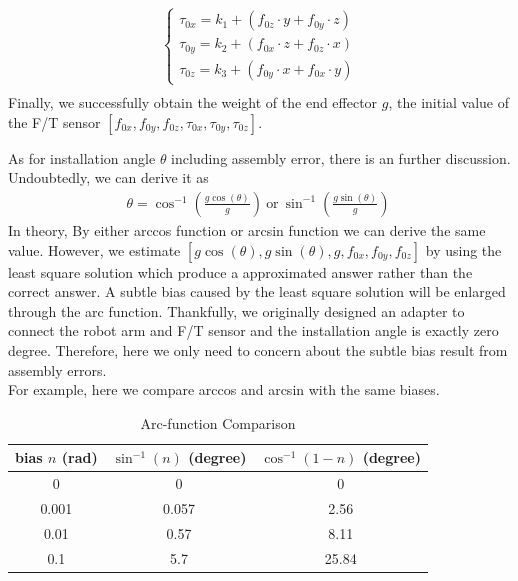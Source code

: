 \begin{equation}
\begin{split}
\left\{\begin{matrix}
\tau _{0x}	=	k_1	+ \left( f_{0z} \cdot y + f_{0y} \cdot z \right) \\
\tau _{0y} 	=	k_2	+ \left( f_{0x} \cdot z + f_{0z} \cdot x \right) \\
\tau _{0z} 	=	k_3 + \left( f_{0y} \cdot x + f_{0x} \cdot y \right)
\end{matrix}\right.\\
\end{split}
\end{equation}
Finally, we successfully obtain the weight of the end effector $g$, the initial value of the F/T sensor $[f_{0x},f_{0y},f_{0z},\tau_{0x},\tau_{0y},\tau_{0z}]$.
\par
As for installation angle $\theta$ including assembly error,  there is an further discussion. Undoubtedly, we can derive it as
\begin{equation}
\begin{split}
\theta = \cos^{-1}\left(\frac{g\cos(\theta)}{g}\right)\ \text{or} \ \sin^{-1}\left(\frac{g\sin(\theta)}{g}\right)\
\end{split}
\end{equation}
In theory, By either arccos function or arcsin function we can derive the same value. However, we estimate $[g\cos(\theta),g\sin(\theta),g,f_{0x},f_{0y},f_{0z}]$ by using the least square solution which produce a approximated answer rather than the correct answer. A subtle bias caused by the least square solution will be enlarged through the arc function. 
Thankfully, we originally designed an adapter to connect the robot arm and F/T sensor and the installation angle is exactly zero degree. Therefore, here we only need to concern about the subtle bias result from assembly errors.\\
For example, here we compare arccos and arcsin with the same biases.
\begin{table}[htbp]
\centering
\caption{Arc-function Comparison}
\label{tab:arc}
\begin{tabular}{c|c|c} 
\hline \hline
bias $n$ (rad)	&$\sin^{-1}(n)$	(degree)	&$\cos^{-1}(1-n)$ (degree)\\
\hline
0				&0							&0\\
0.001			&0.057						&2.56\\
0.01			&0.57						&8.11\\
0.1				&5.7						&25.84
\end{tabular}
\end{table}
